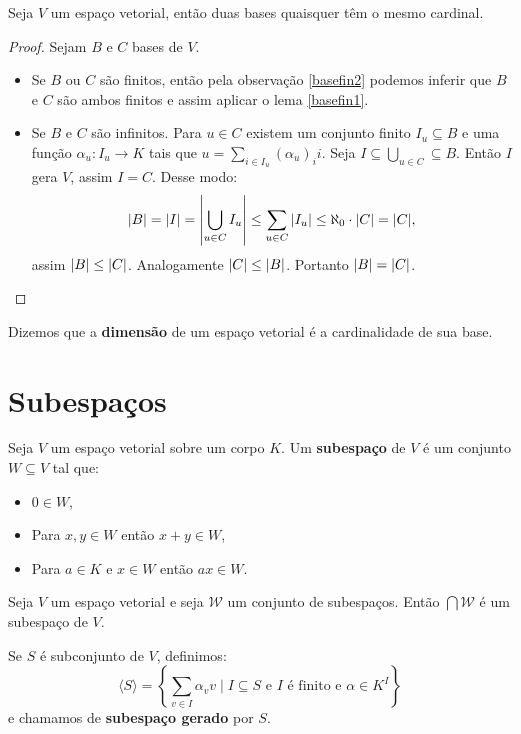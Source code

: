 \documentclass[11pt,twoside,a4paper]{book}
\begin{document}
\begin{teorema}
Seja $V$ um espaço vetorial, então duas bases quaisquer têm o mesmo cardinal.
\end{teorema}
\begin{proof}
Sejam $B$ e $C$ bases de $V$.
\begin{itemize}
\item Se $B$ ou $C$ são finitos, então pela observação \ref{basefin2} podemos inferir que $B$ e $C$ são ambos finitos e assim aplicar o lema \ref{basefin1}.
\item Se $B$ e $C$ são infinitos. Para $u\in C$ existem um conjunto finito $I_u\subseteq B$ e uma função $\alpha_u:I_u\rightarrow K$ tais que $u=\sum_{i\in I_u}(\alpha_u)_ii$. Seja $I\subseteq\bigcup_{u\in C}\subseteq B$. Então $I$ gera $V$, assim $I=C$. Desse modo:
\[
\abs{B}=\abs{I}=\abs{\bigcup_{u\in C}I_u}\leq\sum_{u\in C}\abs{I_u}\leq\aleph_0\cdot\abs{C}=\abs{C},
\]
assim $\abs{B}\leq\abs{C}$. Analogamente $\abs{C}\leq\abs{B}$. Portanto $\abs{B}=\abs{C}$.
\end{itemize}
\end{proof}
\begin{definicao}
Dizemos que a \textbf{dimensão} de um espaço vetorial é a cardinalidade de sua base.
\end{definicao}

\section{Subespaços}

\begin{definicao}
Seja $V$ um espaço vetorial sobre um corpo $K$. Um \textbf{subespaço} de $V$ é um conjunto $W\subseteq V$ tal que:
\begin{itemize}
\item $0\in W$,
\item Para $x,y\in W$ então $x+y\in W$,
\item Para $a\in K$ e $x\in W$ então $ax\in W$.
\end{itemize}
\end{definicao}

\begin{proposicao}
Seja $V$ um espaço vetorial e seja $\mathcal{W}$ um conjunto de subespaços. Então $\bigcap\mathcal{W}$ é um subespaço de $V$.
\end{proposicao}

\begin{definicao}
Se $S$ é subconjunto de $V$, definimos:
\[
\langle S\rangle=\left\{\sum\limits_{v\in I}\alpha_vv\mid I\subseteq S\text{ e }I\text{ é finito e }\alpha\in K^I\right\}
\]
e chamamos de \textbf{subespaço gerado} por $S$.
\end{definicao}
\end{document}
